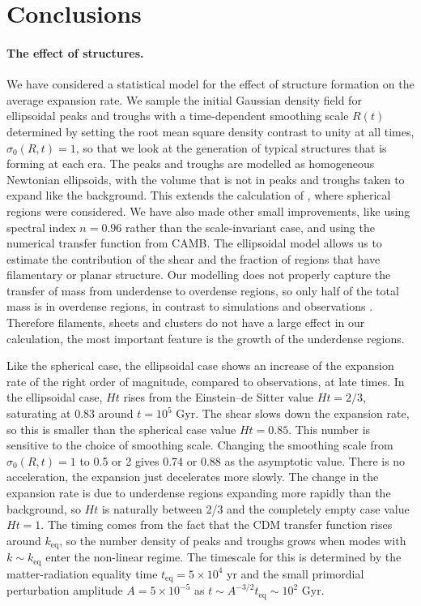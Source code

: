 \documentclass[11pt, a4paper]{article}
\newcommand{\para}{\paragraph}
\newcommand{\keq}{k_{\mathrm{eq}}}
\newcommand{\teq}{t_{\mathrm{eq}}}
\begin{document}
\section{Conclusions} \label{sec:conc}

\para{The effect of structures.}

We have considered a statistical model for the effect of structure formation on the average expansion rate. We sample the initial Gaussian density field for ellipsoidal peaks and troughs with a time-dependent smoothing scale $R(t)$ determined by setting the root mean square density contrast to unity at all times, $\sigma_0(R,t)=1$, so that we look at the generation of typical structures that is forming at each era. The peaks and troughs are modelled as homogeneous Newtonian ellipsoids, with the volume that is not in peaks and troughs taken to expand like the background. This extends the calculation of \cite{Rasanen:2008it}, where spherical regions were considered. We have also made other small improvements, like using spectral index $n=0.96$ rather than the scale-invariant case, and using the numerical transfer function from CAMB. The ellipsoidal model allows us to estimate the contribution of the shear and the fraction of regions that have filamentary or planar structure. Our modelling does not properly capture the transfer of mass from underdense to overdense regions, so only half of the total mass is in overdense regions, in contrast to simulations and observations \cite{Bond:1995yt, Cautun:2014fwa}.
Therefore filaments, sheets and clusters do not have a large effect in our calculation, the most important feature is the growth of the underdense regions.

Like the spherical case, the ellipsoidal case shows an increase of the expansion rate of the right order of magnitude,  compared to observations, at late times. In the ellipsoidal case, $Ht$ rises from the Einstein--de Sitter value $Ht=2/3$, saturating at $0.83$ around $t=10^5$ Gyr. The shear slows down the expansion rate, so this is smaller than the spherical case value $Ht=0.85$. This number is sensitive to the choice of smoothing scale. Changing the smoothing scale from $\sigma_0(R,t)=1$ to 0.5 or 2 gives 0.74 or 0.88 as the asymptotic value.
There is no acceleration, the expansion just decelerates more slowly. The change in the expansion rate is due to underdense regions expanding more rapidly than the background, so $Ht$ is naturally between 2/3 and the completely empty case value $Ht=1$. The timing comes from the fact that the CDM transfer function rises around $\keq$, so the number density of peaks and troughs grows when modes with $k\sim\keq$ enter the non-linear regime. The timescale for  this is determined by the matter-radiation equality time $\teq=5\times10^4$ yr and the small primordial perturbation amplitude $A=5\times10^{-5}$ as $t\sim A^{-3/2}\teq\sim10^{2}$ Gyr.
\end{document}
